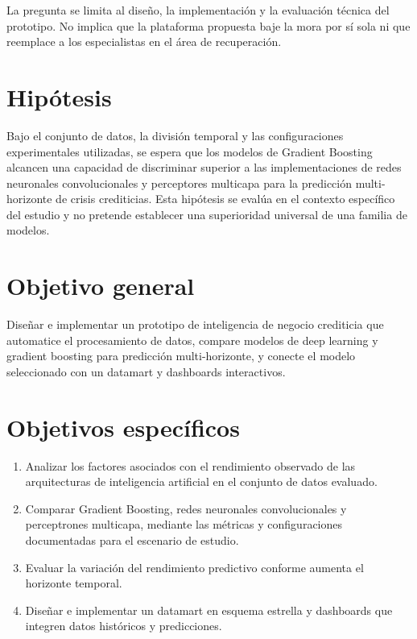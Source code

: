 La pregunta se limita al diseño, la implementación y la evaluación técnica del prototipo. No implica que la plataforma propuesta baje la mora por sí sola ni que reemplace a los especialistas en el área de recuperación.

\section{Hipótesis}

Bajo el conjunto de datos, la división temporal y las configuraciones experimentales utilizadas, se espera que los modelos de Gradient Boosting alcancen una capacidad de discriminar superior a las implementaciones de redes neuronales convolucionales y perceptores multicapa para la predicción multi-horizonte de crisis crediticias. Esta hipótesis se evalúa en el contexto específico del estudio y no pretende establecer una superioridad universal de una familia de modelos.

\section{Objetivo general}

Diseñar e implementar un prototipo de inteligencia de negocio crediticia que automatice el procesamiento de datos, compare modelos de deep learning y gradient boosting para predicción multi-horizonte, y conecte el modelo seleccionado con un datamart y dashboards interactivos.

\section{Objetivos específicos}

\begin{enumerate}
    \item Analizar los factores asociados con el rendimiento observado de las arquitecturas de inteligencia artificial en el conjunto de datos evaluado.
    \item Comparar Gradient Boosting, redes neuronales convolucionales y perceptrones multicapa, mediante las métricas y configuraciones documentadas para el escenario de estudio.
    \item Evaluar la variación del rendimiento predictivo conforme aumenta el horizonte temporal.
    \item Diseñar e implementar un datamart en esquema estrella y dashboards que integren datos históricos y predicciones.
\end{enumerate}


